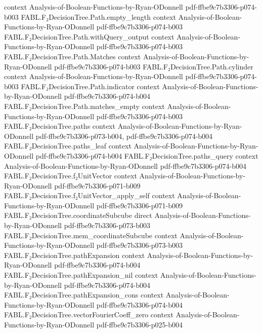 \begin{theorem}
  {context}
  {Analysis-of-Boolean-Functions-by-Ryan-ODonnell}
  {pdf-ffbe9c7b3306-p074-b003}
\proofstep
  {FABL.F₂DecisionTree.Path.empty_length}
  {context}
  {Analysis-of-Boolean-Functions-by-Ryan-ODonnell}
  {pdf-ffbe9c7b3306-p074-b003}
\proofstep
  {FABL.F₂DecisionTree.Path.withQuery_output}
  {context}
  {Analysis-of-Boolean-Functions-by-Ryan-ODonnell}
  {pdf-ffbe9c7b3306-p074-b003}
\proofstep
  {FABL.F₂DecisionTree.Path.Matches}
  {context}
  {Analysis-of-Boolean-Functions-by-Ryan-ODonnell}
  {pdf-ffbe9c7b3306-p074-b003}
\proofstep
  {FABL.F₂DecisionTree.Path.cylinder}
  {context}
  {Analysis-of-Boolean-Functions-by-Ryan-ODonnell}
  {pdf-ffbe9c7b3306-p074-b003}
\proofstep
  {FABL.F₂DecisionTree.Path.indicator}
  {context}
  {Analysis-of-Boolean-Functions-by-Ryan-ODonnell}
  {pdf-ffbe9c7b3306-p074-b004}
\proofstep
  {FABL.F₂DecisionTree.Path.matches_empty}
  {context}
  {Analysis-of-Boolean-Functions-by-Ryan-ODonnell}
  {pdf-ffbe9c7b3306-p074-b003}
\proofstep
  {FABL.F₂DecisionTree.paths}
  {context}
  {Analysis-of-Boolean-Functions-by-Ryan-ODonnell}
  {pdf-ffbe9c7b3306-p073-b004,
    pdf-ffbe9c7b3306-p074-b004}
\proofstep
  {FABL.F₂DecisionTree.paths_leaf}
  {context}
  {Analysis-of-Boolean-Functions-by-Ryan-ODonnell}
  {pdf-ffbe9c7b3306-p074-b004}
\proofstep
  {FABL.F₂DecisionTree.paths_query}
  {context}
  {Analysis-of-Boolean-Functions-by-Ryan-ODonnell}
  {pdf-ffbe9c7b3306-p074-b004}
\proofstep
  {FABL.F₂DecisionTree.f₂UnitVector}
  {context}
  {Analysis-of-Boolean-Functions-by-Ryan-ODonnell}
  {pdf-ffbe9c7b3306-p071-b009}
\proofstep
  {FABL.F₂DecisionTree.f₂UnitVector_apply_self}
  {context}
  {Analysis-of-Boolean-Functions-by-Ryan-ODonnell}
  {pdf-ffbe9c7b3306-p071-b009}
\proofstep
  {FABL.F₂DecisionTree.coordinateSubcube}
  {direct}
  {Analysis-of-Boolean-Functions-by-Ryan-ODonnell}
  {pdf-ffbe9c7b3306-p073-b003}
\proofstep
  {FABL.F₂DecisionTree.mem_coordinateSubcube}
  {context}
  {Analysis-of-Boolean-Functions-by-Ryan-ODonnell}
  {pdf-ffbe9c7b3306-p073-b003}
\proofstep
  {FABL.F₂DecisionTree.pathExpansion}
  {context}
  {Analysis-of-Boolean-Functions-by-Ryan-ODonnell}
  {pdf-ffbe9c7b3306-p074-b004}
\proofstep
  {FABL.F₂DecisionTree.pathExpansion_nil}
  {context}
  {Analysis-of-Boolean-Functions-by-Ryan-ODonnell}
  {pdf-ffbe9c7b3306-p074-b004}
\proofstep
  {FABL.F₂DecisionTree.pathExpansion_cons}
  {context}
  {Analysis-of-Boolean-Functions-by-Ryan-ODonnell}
  {pdf-ffbe9c7b3306-p074-b004}
\proofstep
  {FABL.F₂DecisionTree.vectorFourierCoeff_zero}
  {context}
  {Analysis-of-Boolean-Functions-by-Ryan-ODonnell}
  {pdf-ffbe9c7b3306-p025-b004}

\end{theorem}

